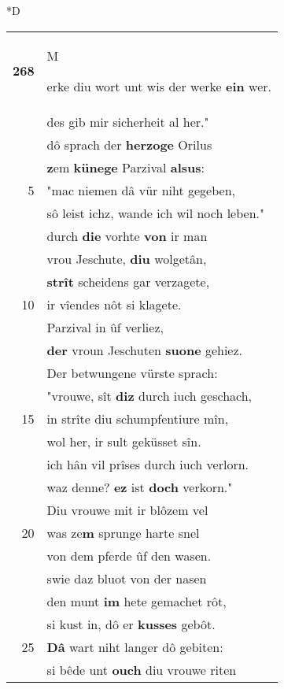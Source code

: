 \documentclass[8pt,a4paper,notitlepage]{article}
\begin{document}
\begin{table}[ht]
\begin{minipage}[t]{0.5\linewidth}
\small
\begin{center}*D
\end{center}
\begin{tabular}{rl}
\textbf{268} & \begin{large}M\end{large}erke diu wort unt wis der werke \textbf{ein} wer.\\ 
 & des gib mir sicherheit al her."\\ 
 & dô sprach der \textbf{herzoge} Orilus\\ 
 & \textbf{z}em \textbf{künege} Parzival \textbf{alsus}:\\ 
5 & "mac niemen dâ vür niht gegeben,\\ 
 & sô leist ichz, wande ich wil noch leben."\\ 
 & durch \textbf{die} vorhte \textbf{von} ir man\\ 
 & vrou Jeschute, \textbf{diu} wolgetân,\\ 
 & \textbf{strît} scheidens gar verzagete,\\ 
10 & ir vîendes nôt si klagete.\\ 
 & Parzival in ûf verliez,\\ 
 & \textbf{der} vroun Jeschuten \textbf{suone} gehiez.\\ 
 & Der betwungene vürste sprach:\\ 
 & "vrouwe, sît \textbf{diz} durch iuch geschach,\\ 
15 & in strîte diu schumpfentiure mîn,\\ 
 & wol her, ir sult geküsset sîn.\\ 
 & ich hân vil prîses durch iuch verlorn.\\ 
 & waz denne? \textbf{ez} ist \textbf{doch} verkorn."\\ 
 & Diu vrouwe mit ir blôzem vel\\ 
20 & was ze\textbf{m} sprunge harte snel\\ 
 & von dem pferde ûf den wasen.\\ 
 & swie daz bluot von der nasen\\ 
 & den munt \textbf{im} hete gemachet rôt,\\ 
 & si kust in, dô er \textbf{kusses} gebôt.\\ 
25 & \textbf{Dâ} wart niht langer dô gebiten:\\ 
 & si bêde unt \textbf{ouch} diu vrouwe riten\\ 

\end{tabular}
\end{minipage}
\end{table}
\end{document}
